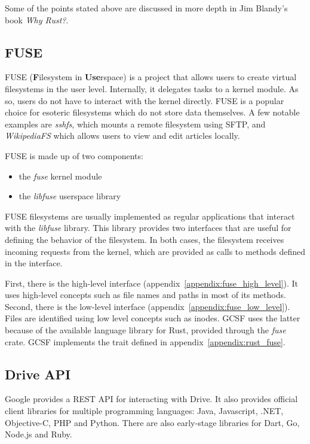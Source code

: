 Some of the points stated above are discussed in more depth in Jim Blandy's book \emph{Why Rust?}\cite{why_rust}.

\subsection{FUSE}

FUSE (\textbf{F}ilesystem in \textbf{Use}rspace) is a project that allows users to create virtual filesystems in the user level. Internally, it delegates tasks to a kernel module. As so, users do not have to interact with the kernel directly. FUSE is a popular choice for esoteric filesystems which do not store data themselves. A few notable examples are \emph{sshfs}\cite{sshfs}, which mounts a remote filesystem using SFTP\cite{sftp}, and \emph{WikipediaFS}\cite{wikipediafs} which allows users to view and edit articles locally.

FUSE is made up of two components:
\begin{itemize}
  \item the \textit{fuse} kernel module
  \item the \textit{libfuse} userspace library
\end{itemize}

FUSE filesystems are usually implemented as regular applications that interact with the \textit{libfuse} library. This library provides two interfaces that are useful for defining the behavior of the filesystem. In both cases, the filesystem receives incoming requests from the kernel, which are provided as calls to methods defined in the interface.

First, there is the high-level interface (appendix~\ref{appendix:fuse_high_level}). It uses high-level concepts such as file names and paths in most of its methods. Second, there is the low-level interface (appendix~\ref{appendix:fuse_low_level}). Files are identified using low level concepts such as inodes\cite{tanenbaum}. GCSF uses the latter because of the available language library for Rust, provided through the \emph{fuse}\cite{fuse_crate} crate. GCSF implements the  trait defined in appendix~\ref{appendix:rust_fuse}.

\subsection{Drive API}

Google provides a REST API for interacting with Drive\cite{google_drive_rest_api_overview}. It also provides official client libraries for multiple programming languages: Java, Javascript, .NET, Objective-C, PHP and Python. There are also early-stage libraries for Dart, Go, Node.js and Ruby.

